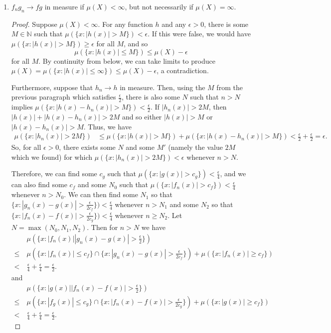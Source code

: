\documentclass[10pt]{article}
\newcommand{\N}{\mathbb{N}}
\begin{document}
\begin{enumerate}
\begin{enumerate}
\item $f_ng_n \rightarrow fg$ in measure if $\mu(X) < \infty$, but not necessarily if $\mu(X) = \infty$.

\begin{proof}

Suppose $\mu(X) < \infty$.  For any function $h$ and any $\epsilon > 0$, there is some $M \in \N$ such that $\mu(\{x : |h(x)| > M\}) < \epsilon$.  If this were false, we would have $\mu(\{x : |h(x)| > M\}) \geq \epsilon$ for all $M$, and so
$$
\mu(\{x : |h(x)| \leq M\}) \leq \mu(X) - \epsilon
$$
for all $M$.  By continuity from below, we can take limits to produce $\mu(X) = \mu(\{x: |h(x)| \leq \infty\}) \leq \mu(X) - \epsilon$, a contradiction.

Furthermore, suppose that $h_n \rightarrow h$ in measure.  Then, using the $M$ from the previous paragraph which satisfies $\frac{\epsilon}{2}$, there is also some $N$ such that $n > N$ implies $\mu(\{x : |h(x) - h_n(x)| > M\}) < \frac{\epsilon}{2}$.  If $|h_n(x)| > 2M$, then $|h(x)| + |h(x) - h_n(x)| > 2M$ and so either $|h(x)| > M$ or $|h(x) - h_n(x)| > M$.  Thus, we have
\begin{align*}
\mu(\{x : |h_n(x)| > 2M\}) &\leq \mu(\{x:|h(x)| > M\}) + \mu(\{x:|h(x) - h_n(x)| > M\}) < \frac{\epsilon}{2} + \frac{\epsilon}{2} = \epsilon.
\end{align*}
So, for all $\epsilon > 0$, there exists some $N$ and some $M'$ (namely the value $2M$ which we found) for which $\mu(\{x : |h_n(x)| > 2M\}) < \epsilon$ whenever $n > N$.

Therefore, we can find some $c_g$ such that $\mu(\{x : |g(x)| > c_g\}) < \frac{\epsilon}{4}$, and we can also find some $c_f$ and some $N_0$ such that $\mu(\{x : |f_n(x)| > c_f\}) < \frac{\epsilon}{4}$ whenever $n > N_0$.  We can then find some $N_1$ so that $\{x : |g_n(x) - g(x)| > \frac{\epsilon}{2c_f}\}) < \frac{\epsilon}{4}$ whenever $n > N_1$ and some $N_2$ so that $\{x : |f_n(x) - f(x)| > \frac{\epsilon}{2c_g}\}) < \frac{\epsilon}{4}$ whenever $n \geq N_2$.  Let $N = \max(N_0,N_1,N_2)$.  Then for $n > N$ we have
\begin{align*}
&\mu(\{x : |f_n(x)||g_n(x) - g(x)| > \frac{\epsilon}{2}\})
\\
\leq \ &\mu(\{x : |f_n(x)| \leq c_f\} \cap \{x : |g_n(x) - g(x)| > \frac{\epsilon}{2c_f}\}) + \mu(\{x : |f_n(x)| \geq c_f\})
\\
< \ & \frac{\epsilon}{4} + \frac{\epsilon}{4} = \frac{\epsilon}{2}.
\end{align*}
and
\begin{align*}
&\mu(\{x : |g(x)||f_n(x) - f(x)| > \frac{\epsilon}{2}\})
\\
\leq \ &\mu(\{x : |f_g(x)| \leq c_g\} \cap \{x : |f_n(x) - f(x)| > \frac{\epsilon}{2c_g}\}) + \mu(\{x : |g(x)| \geq c_f\})
\\
< \ & \frac{\epsilon}{4} + \frac{\epsilon}{4} = \frac{\epsilon}{2}.
\end{align*}


\end{proof}
\end{enumerate}
\end{enumerate}
\end{document}
